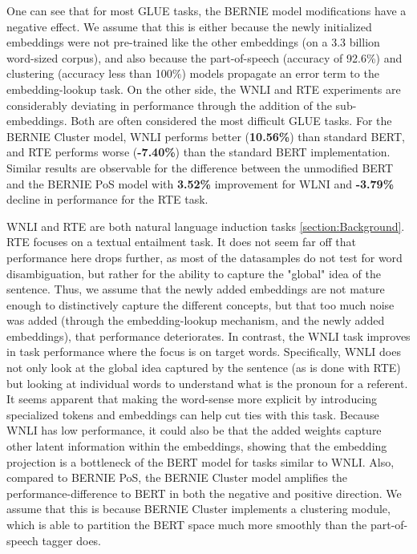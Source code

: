 \documentclass[a4paper,12pt,oneside,openright]{report}
\begin{document}
One can see that for most GLUE tasks, the BERNIE model modifications have a negative effect. 
We assume that this is either because the newly initialized embeddings were not pre-trained like the other embeddings (on a 3.3 billion word-sized corpus), and also because the part-of-speech (accuracy of 92.6\%) and clustering (accuracy less than 100\%) models propagate an error term to the embedding-lookup task.
On the other side, the WNLI and RTE experiments are considerably deviating in performance through the addition of the sub-embeddings.
Both are often considered the most difficult GLUE tasks.
For the BERNIE Cluster model, WNLI performs better (\textbf{10.56\%}) than standard BERT, and RTE performs worse  (\textbf{-7.40\%}) than the standard BERT implementation.
Similar results are observable for the difference between the unmodified BERT and the BERNIE PoS model with \textbf{3.52\%} improvement for WLNI and \textbf{-3.79\%} decline in performance for the RTE task.

WNLI and RTE are both natural language induction tasks \ref{section:Background}.
RTE focuses on a textual entailment task. 
It does not seem far off that performance here drops further, as most of the datasamples do not test for word disambiguation, but rather for the ability to capture the "global" idea of the sentence.
Thus, we assume that the newly added embeddings are not mature enough to distinctively capture the different concepts, but that too much noise was added (through the embedding-lookup mechanism, and the newly added embeddings), that performance deteriorates.
In contrast, the WNLI task improves in task performance where the focus is on target words. 
Specifically, WNLI does not only look at the global idea captured by the sentence (as is done with RTE) but looking at individual words to understand what is the pronoun for a referent.
It seems apparent that making the word-sense more explicit by introducing specialized tokens and embeddings can help cut ties with this task.
Because WNLI has low performance, it could also be that the added weights capture other latent information within the embeddings, showing that the embedding projection is a bottleneck of the BERT model for tasks similar to WNLI.
Also, compared to BERNIE PoS, the BERNIE Cluster model amplifies the performance-difference to BERT in both the negative and positive direction.
We assume that this is because BERNIE Cluster implements a clustering module, which is able to partition the BERT space much more smoothly than the part-of-speech tagger does.
\end{document}
